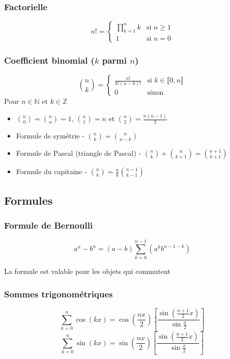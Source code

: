 \documentclass[openany]{book}
\begin{document}
\subsubsection{Factorielle}
\[ n! = \begin{cases}
    \prod_{k=1}^n k & \text{si } n \geq 1 \\
    1 & \text{si } n = 0
\end{cases} \]

\subsubsection{Coefficient binomial ($k$ parmi $n$)}
\[ \binom{n}{k} = \begin{cases} 
    \frac{n!}{k!(n-k)!} & \text{si } k \in \llbracket 0, n \rrbracket \\
    0 & \text{sinon}
\end{cases} \]
\noindent Pour $ n \in \mathbb{N} $ et $ k \in \mathbb{Z} $

\begin{itemize}
    \item $ \binom{n}{0} = \binom{n}{n} = 1 $, $ \binom{n}{1} = n  $ et $ \binom{n}{2} = \frac{n(n-1)}{2} $
    \item Formule de symétrie - $ \binom{n}{k} = \binom{n}{n-k} $ 
    \item Formule de Pascal (triangle de Pascal) - $ \binom{n}{k} + \binom{n}{k+1} = \binom{n+1}{k+1} $
    \item Formule du capitaine - $ \binom{n}{k} = \frac{n}{k}\binom{n-1}{k-1} $
\end{itemize}

\subsection{Formules}
\subsubsection{Formule de Bernoulli}
\[a^n - b^n = (a-b)\sum_{k=0}^{n-1}(a^kb^{n-1-k}) \]

La formule est valable pour les objets qui commutent

\subsubsection{Sommes trigonométriques}
\[ \sum_{k=0}^n\cos{(kx)} = \cos{(\frac{nx}{2})}[\frac{\sin(\frac{n+1}{2}x)}{\sin{\frac{x}{2}}}] \]
\[ \sum_{k=0}^n\sin{(kx)} = \sin{(\frac{nx}{2})}[\frac{\sin(\frac{n+1}{2}x)}{\sin{\frac{x}{2}}}] \]
\end{document}
